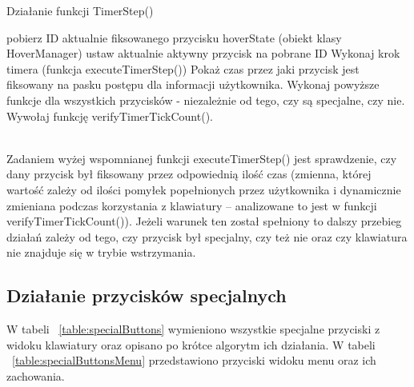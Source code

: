 \documentclass[twoside,a4paper]{book}
\begin{document}
\begin{algorithm}
\caption{Działanie funkcji TimerStep()}
\label{sec:alg1}
\begin{algorithmic}
\STATE pobierz ID aktualnie fiksowanego przycisku
\STATE hoverState (obiekt klasy HoverManager) ustaw aktualnie aktywny przycisk na pobrane ID
\STATE Wykonaj krok timera (funkcja executeTimerStep())
\STATE Pokaż czas przez jaki przycisk jest fiksowany na pasku postępu dla informacji użytkownika.
\ENDIF
\ELSE
\STATE Wykonaj powyższe funkcje dla wszystkich przycisków - niezależnie od tego, czy są specjalne, czy nie.
\ENDIF
\ENDIF
\STATE Wywołaj funkcję verifyTimerTickCount().
\end{algorithmic}
\end{algorithm}
\\Zadaniem wyżej wspomnianej funkcji \-executeTimerStep() jest sprawdzenie, czy dany przycisk był fiksowany przez odpowiednią ilość czas (zmienna, której wartość zależy od ilości pomyłek popełnionych przez użytkownika i dynamicznie zmieniana podczas korzystania z klawiatury – analizowane to jest w funkcji ve\-ri\-fyTimerTickCount()). Jeżeli warunek ten został spełniony to dalszy przebieg działań zależy od tego, czy przycisk był specjalny, czy też nie oraz czy klawiatura nie znajduje się w trybie wstrzymania. 
\subsection{Działanie przycisków specjalnych}
W tabeli ~\ref{table:specialButtons} wymieniono wszystkie specjalne przyciski z widoku klawiatury oraz opisano po krótce algorytm ich działania. W tabeli ~\ref{table:specialButtonsMenu} przedstawiono przyciski widoku menu oraz ich zachowania.
\end{document}
